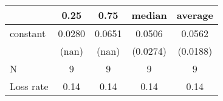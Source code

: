 \begin{tabular}{lcccc}
\hline
          &  0.25  &  0.75  &  median  & average   \\
\midrule
\midrule
constant  & 0.0280 & 0.0651 & 0.0506   & 0.0562    \\
          & (nan)  & (nan)  & (0.0274) & (0.0188)  \\
N         & 9      & 9      & 9        & 9         \\
Loss rate & 0.14   & 0.14   & 0.14     & 0.14      \\
\hline
\end{tabular}